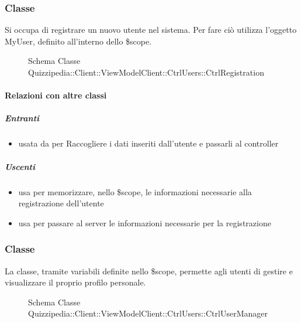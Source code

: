 \subsubsection{Classe }
Si occupa di registrare un nuovo utente nel sistema. Per fare ciò utilizza l'oggetto MyUser, definito all'interno dello \$scope.
\begin{figure}[H]
\centering
\noindent{}
\caption[Schema Classe CtrlRegistration]{Schema Classe Quizzipedia::Client::ViewModelClient::CtrlUsers::CtrlRegistration}
\end{figure}
\paragraph{Relazioni con altre classi}
\subparagraph{Entranti}
\begin{itemize}
\item usata da  per Raccogliere i dati inseriti dall'utente e passarli al controller
\end{itemize}
\subparagraph{Uscenti}
\begin{itemize}
\item usa  per memorizzare, nello \$scope, le informazioni necessarie alla registrazione dell'utente
\item usa  per passare al server le informazioni necessarie per la registrazione
\end{itemize}
\subsubsection{Classe }
La classe, tramite variabili definite nello \$scope, permette agli utenti di gestire e visualizzare il proprio profilo personale.
\begin{figure}[H]
\centering
\noindent{}
\caption[Schema Classe CtrlUserManager]{Schema Classe Quizzipedia::Client::ViewModelClient::CtrlUsers::CtrlUserManager}
\end{figure}
